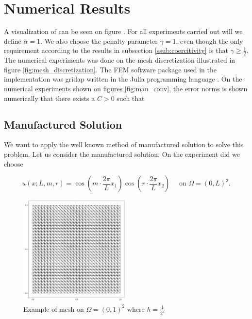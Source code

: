 

\newpage
\section{Numerical Results}%
\label{sec:numerical_results}


A visualization of  can be seen on figure .
For all experiments carried out will we define $\alpha  = 1 $. We also choose the penalty parameter $ \gamma = 1$, even though the only requirement according to the results in subsection \ref{ssub:coercitivity} is that $\gamma \ge  \frac{1}{2}$. The numerical experiments was done on the mesh discretization illustrated in figure \ref{fig:mesh_discretization}.
The FEM software package used in the implementation was gridap written in the Julia programming language \cite{verdugo22, julia17}.
On the numerical experiments shown on figures \ref{fig:man_conv},  the error norms is shown numerically that there exists a $C > 0$ such
that


\newpage
\subsection{Manufactured Solution}%
\label{sub:manufactured_solution}
We want to apply the well known method of manufactured solution to solve this problem.
Let us consider the manufactured solution. On the experiment did we choose

\begin{equation}
    \label{eq:man_sol}
u\left( x; L,m,r \right) = \cos\left(  m\cdot \frac{2\pi}{L}  x_{1}\right)  \cos \left(r\cdot  \frac{2\pi}{L} x_{2} \right) \quad \text{ on }   \Omega =  \left( 0,L  \right)^{2}
.\end{equation}

\begin{figure}[tbh!]
    \centering
    \includegraphics[width=0.5\textwidth]{figures/model/L_1.0_m_1_r_1n_30_grid.png}
    \caption{Example of mesh on $ \Omega =  \left( 0,1  \right)^{2}$ where $h=\frac{1}{2^{4}}$  }
    \label{fig:sol_l1_m1_r1}
\end{figure}


